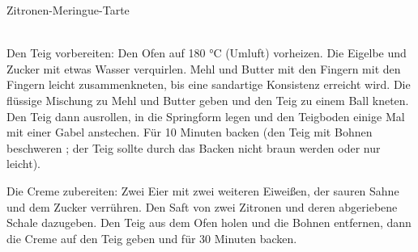 \begin{recipe}
[ %
    bakingtime={\unit[50]{min}},
    bakingtemperature={\Fanoven\ \unit[180]{C}},
    source = Sophie
]
{Zitronen-Meringue-Tarte}




\preparation
{ %
    \\
Den Teig vorbereiten: Den Ofen auf 180 °C (Umluft) vorheizen. Die Eigelbe und Zucker mit etwas Wasser verquirlen. Mehl und Butter mit den Fingern mit den Fingern leicht zusammenkneten, bis eine sandartige Konsistenz erreicht wird. Die flüssige Mischung zu Mehl und Butter geben und den Teig zu einem Ball kneten. Den Teig dann ausrollen, in die Springform legen und den Teigboden einige Mal mit einer Gabel anstechen. Für 10 Minuten backen (den Teig mit Bohnen beschweren ; der Teig sollte durch das Backen nicht braun werden oder nur leicht).

Die Creme zubereiten: Zwei Eier mit zwei weiteren Eiweißen, der sauren Sahne und dem Zucker verrühren. Den Saft von zwei Zitronen und deren abgeriebene Schale dazugeben. Den Teig aus dem Ofen holen und die Bohnen entfernen, dann die Creme auf den Teig geben und für 30 Minuten backen.

}
\end{recipe}
